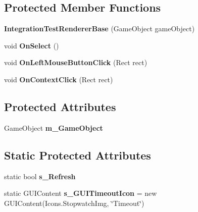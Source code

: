 \subsection*{Protected Member Functions}
\begin{DoxyCompactItemize}
\item 
\mbox{\label{class_unity_test_1_1_integration_test_renderer_base_ae051c2bbc0d3bfac2e4de3bb3f3762c5}} 
{\bfseries Integration\+Test\+Renderer\+Base} (Game\+Object game\+Object)
\item 
\mbox{\label{class_unity_test_1_1_integration_test_renderer_base_a5c1fe59f1f2fc8cad050a18661b9cfb0}} 
void {\bfseries On\+Select} ()
\item 
\mbox{\label{class_unity_test_1_1_integration_test_renderer_base_a2a2bf17abbf9f9769533182ae375b8e1}} 
void {\bfseries On\+Left\+Mouse\+Button\+Click} (Rect rect)
\item 
\mbox{\label{class_unity_test_1_1_integration_test_renderer_base_a0418379e2d80671ba3f1f4c971fc9241}} 
void {\bfseries On\+Context\+Click} (Rect rect)
\end{DoxyCompactItemize}
\subsection*{Protected Attributes}
\begin{DoxyCompactItemize}
\item 
\mbox{\label{class_unity_test_1_1_integration_test_renderer_base_ac63f05b01068765f5662469f583abd0f}} 
Game\+Object {\bfseries m\+\_\+\+Game\+Object}
\end{DoxyCompactItemize}
\subsection*{Static Protected Attributes}
\begin{DoxyCompactItemize}
\item 
\mbox{\label{class_unity_test_1_1_integration_test_renderer_base_a3e39f07cb629835afda8654bcb64ab8b}} 
static bool {\bfseries s\+\_\+\+Refresh}
\item 
\mbox{\label{class_unity_test_1_1_integration_test_renderer_base_af17a613740ba65a51fd9bb5b814448d1}} 
static G\+U\+I\+Content {\bfseries s\+\_\+\+G\+U\+I\+Timeout\+Icon} = new G\+U\+I\+Content(Icons.\+Stopwatch\+Img, \char`\"{}Timeout\char`\"{})
\end{DoxyCompactItemize}
